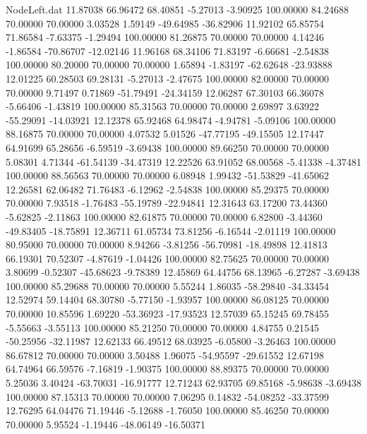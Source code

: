 \begin{filecontents}{NodeLeft.dat}
  11.87038   66.96472   68.40851    -5.27013   -3.90925  100.00000   84.24688   70.00000   70.00000    3.03528    1.59149  -49.64985  -36.82906
  11.92102   65.85754   71.86584    -7.63375   -1.29494  100.00000   81.26875   70.00000   70.00000    4.14246   -1.86584  -70.86707  -12.02146
  11.96168   68.34106   71.83197    -6.66681   -2.54838  100.00000   80.20000   70.00000   70.00000    1.65894   -1.83197  -62.62648  -23.93888
  12.01225   60.28503   69.28131    -5.27013   -2.47675  100.00000   82.00000   70.00000   70.00000    9.71497    0.71869  -51.79491  -24.34159
  12.06287   67.30103   66.36078    -5.66406   -1.43819  100.00000   85.31563   70.00000   70.00000    2.69897    3.63922  -55.29091  -14.03921
  12.12378   65.92468   64.98474    -4.94781   -5.09106  100.00000   88.16875   70.00000   70.00000    4.07532    5.01526  -47.77195  -49.15505
  12.17447   64.91699   65.28656    -6.59519   -3.69438  100.00000   89.66250   70.00000   70.00000    5.08301    4.71344  -61.54139  -34.47319
  12.22526   63.91052   68.00568    -5.41338   -4.37481  100.00000   88.56563   70.00000   70.00000    6.08948    1.99432  -51.53829  -41.65062
  12.26581   62.06482   71.76483    -6.12962   -2.54838  100.00000   85.29375   70.00000   70.00000    7.93518   -1.76483  -55.19789  -22.94841
  12.31643   63.17200   73.44360    -5.62825   -2.11863  100.00000   82.61875   70.00000   70.00000    6.82800   -3.44360  -49.83405  -18.75891
  12.36711   61.05734   73.81256    -6.16544   -2.01119  100.00000   80.95000   70.00000   70.00000    8.94266   -3.81256  -56.70981  -18.49898
  12.41813   66.19301   70.52307    -4.87619   -1.04426  100.00000   82.75625   70.00000   70.00000    3.80699   -0.52307  -45.68623   -9.78389
  12.45869   64.44756   68.13965    -6.27287   -3.69438  100.00000   85.29688   70.00000   70.00000    5.55244    1.86035  -58.29840  -34.33454
  12.52974   59.14404   68.30780    -5.77150   -1.93957  100.00000   86.08125   70.00000   70.00000   10.85596    1.69220  -53.36923  -17.93523
  12.57039   65.15245   69.78455    -5.55663   -3.55113  100.00000   85.21250   70.00000   70.00000    4.84755    0.21545  -50.25956  -32.11987
  12.62133   66.49512   68.03925    -6.05800   -3.26463  100.00000   86.67812   70.00000   70.00000    3.50488    1.96075  -54.95597  -29.61552
  12.67198   64.74964   66.59576    -7.16819   -1.90375  100.00000   88.89375   70.00000   70.00000    5.25036    3.40424  -63.70031  -16.91777
  12.71243   62.93705   69.85168    -5.98638   -3.69438  100.00000   87.15313   70.00000   70.00000    7.06295    0.14832  -54.08252  -33.37599
  12.76295   64.04476   71.19446    -5.12688   -1.76050  100.00000   85.46250   70.00000   70.00000    5.95524   -1.19446  -48.06149  -16.50371

\end{filecontents}
